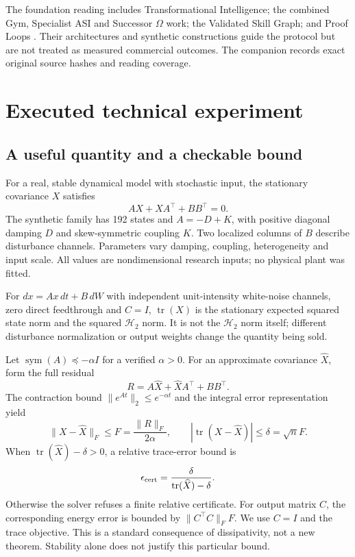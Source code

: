 \documentclass[11pt,letterpaper]{article}
\begin{document}
The foundation reading includes Transformational Intelligence; the combined Gym, Specialist ASI and Successor $\Omega$ work; the Validated Skill Graph; and Proof Loops \cite{ti,gym,vsg,proof}. Their architectures and synthetic constructions guide the protocol but are not treated as measured commercial outcomes. The companion records exact original source hashes and reading coverage.

\section{Executed technical experiment}

\subsection{A useful quantity and a checkable bound}

For a real, stable dynamical model with stochastic input, the stationary covariance $X$ satisfies
\begin{equation}
 AX+XA^\top+BB^\top=0.
\end{equation}
The synthetic family has 192 states and $A=-D+K$, with positive diagonal damping $D$ and skew-symmetric coupling $K$. Two localized columns of $B$ describe disturbance channels. Parameters vary damping, coupling, heterogeneity and input scale. All values are nondimensional research inputs; no physical plant was fitted.

For $dx=Ax\,dt+B\,dW$ with independent unit-intensity white-noise channels, zero direct feedthrough and $C=I$, $\operatorname{tr}(X)$ is the stationary expected squared state norm and the squared $\mathcal H_2$ norm. It is not the $\mathcal H_2$ norm itself; different disturbance normalization or output weights change the quantity being sold.

Let $\operatorname{sym}(A)\preceq-\alpha I$ for a verified $\alpha>0$. For an approximate covariance $\widehat X$, form the full residual
\begin{equation}
R=A\widehat X+\widehat XA^\top+BB^\top.
\end{equation}
The contraction bound $\|e^{At}\|_2\leq e^{-\alpha t}$ and the integral error representation yield
\begin{equation}
\|X-\widehat X\|_F\leq F=\frac{\|R\|_F}{2\alpha},\qquad
|\operatorname{tr}(X-\widehat X)|\leq\delta=\sqrt{n}F.
\end{equation}
When $\operatorname{tr}(\widehat X)-\delta>0$, a relative trace-error bound is
\begin{equation}
\epsilon_{\rm cert}=\frac{\delta}{\operatorname{tr}(\widehat X)-\delta}.
\end{equation}
Otherwise the solver refuses a finite relative certificate. For output matrix $C$, the corresponding energy error is bounded by $\|C^\top C\|_F F$. We use $C=I$ and the trace objective. This is a standard consequence of dissipativity, not a new theorem. Stability alone does not justify this particular bound.
\end{document}
